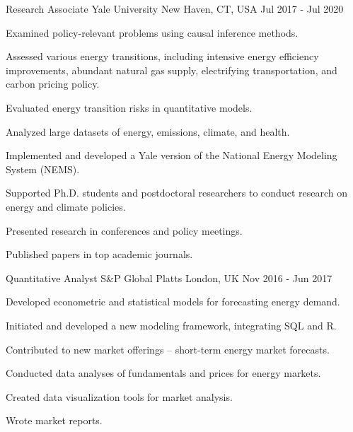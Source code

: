 \begin{cventries}
    \cventry
    {Research Associate} %
    {Yale University} %
    {New Haven, CT, USA} %
    {Jul 2017 - Jul 2020} %
    {
        \begin{cvitems} %
            \item {Examined policy-relevant problems using causal inference methods.}
            \item {Assessed various energy transitions, including intensive energy efficiency improvements, abundant natural gas supply, electrifying transportation, and carbon pricing policy.}
            \item {Evaluated energy transition risks in quantitative models.}
            \item {Analyzed large datasets of energy, emissions, climate, and health.}
            \item {Implemented and developed a Yale version of the National Energy Modeling System (NEMS).}
            \item {Supported Ph.D. students and postdoctoral researchers to conduct research on energy and climate policies.}
            \item {Presented research in conferences and policy meetings.}
            \item {Published papers in top academic journals.}
        \end{cvitems}
    }

    \cventry
    {Quantitative Analyst} %
    {S\&P Global Platts} %
    {London, UK} %
    {Nov 2016 - Jun 2017} %
    {
        \begin{cvitems} %
            \item {Developed econometric and statistical models for forecasting energy demand.}
            \item {Initiated and developed a new modeling framework, integrating SQL and R.}
            \item {Contributed to new market offerings -- short-term energy market forecasts.}
            \item {Conducted data analyses of fundamentals and prices for energy markets.}
            \item {Created data visualization tools for market analysis.}
            \item {Wrote market reports.}
        \end{cvitems}
    }


\end{cventries}

